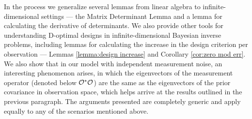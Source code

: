 \documentclass{amsart}
\numberwithin{equation}{section}
\begin{document}
In the process we generalize several lemmas from linear algebra to
infinite-dimensional settings --- the Matrix Determinant Lemma and a
lemma for calculating the derivative of determinants. We also provide
other tools for understanding D-optimal designs in
infinite-dimensional Bayesian inverse problems, including lemmas for
calculating the increase in the design criterion per observation ---
Lemmas \ref{lemma:design increase} and Corollary \ref{cor:zero mod
  err}. We also show that in our model with independent measurement
noise, an interesting phenomenon arises, in which the eigenvectors of
the measurement operator (denoted below $\mathcal{O}^*\mathcal{O}$) are the same as
the eigenvectors of the prior covariance in observation space, which
helps arrive at the results outlined in the previous paragraph. The
arguments presented are completely generic and apply equally to any of
the scenarios mentioned above.

\end{document}
